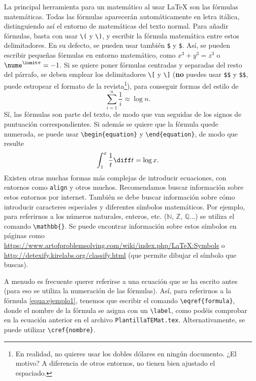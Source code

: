 \documentclass{TEMat-article}
\begin{document}
La principal herramienta para un matemático al usar \LaTeX{} son las fórmulas matemáticas.
Todas las fórmulas aparecerán automáticamente en letra itálica, distinguiendo así el entorno de matemáticas del texto normal.
Para añadir fórmulas, basta con usar \verb+\(+ y \verb+\)+, y escribir la fórmula matemática entre estos delimitadores.
En su defecto, se pueden usar también \verb+$+ y \verb+$+.
Así, se pueden escribir pequeñas fórmulas en entorno matemático, como \(x^3+y^3=z^3\) o $\nume^{\iunit\pi}=-1$.
Si se quiere poner fórmulas centradas y separadas del resto del párrafo, se deben emplear los delimitadores \verb+\[+ y \verb+\]+ (\textbf{no} puedes usar \verb+$$+ y \verb+$$+, puede estropear el formato de la revista\footnote{En realidad, no quieres usar los dobles dólares en ningún documento. ¿El motivo? A diferencia de otros entornos, no tienen bien ajustado el espaciado.}), para conseguir formas del estilo de
\[\sum_{i=1}^n\frac{1}{i}\approx\log n.\]
Sí, las fórmulas son parte del texto, de modo que van seguidas de los signos de puntuación correspondientes.
Si además se quiere que la fórmula quede numerada, se puede usar \verb+\begin{equation}+ y \verb+\end{equation}+, de modo que resulte
\begin{equation}\label{equa:ejemplo1}
\int_{1}^x\frac{1}{t} \diff t = \log x.
\end{equation}
Existen otras muchas formas más complejas de introducir ecuaciones, con entornos como \verb+align+ y otros muchos.
Recomendamos buscar información sobre estos entornos por internet.
También se debe buscar información sobre cómo introducir caracteres especiales y diferentes símbolos matemáticos.
Por ejemplo, para referirnos a los números naturales, enteros, etc. ($\mathbb{N}$, $\mathbb{Z}$, $\mathbb{Q}$...) se utiliza el comando \verb+\mathbb{}+.
Se puede encontrar información sobre estos símbolos en páginas como \url{https://www.artofproblemsolving.com/wiki/index.php/LaTeX:Symbols} o \url{http://detexify.kirelabs.org/classify.html} (que permite dibujar el símbolo que buscas).

A menudo es frecuente querer referirse a una ecuación que se ha escrito antes (para eso se utiliza la numeración de las fórmulas).
Así, para referirnos a la fórmula \eqref{equa:ejemplo1}, tenemos que escribir el comando \verb+\eqref{formula}+, donde el nombre de la fórmula se asigna con un \verb+\label+, como podéis comprobar en la ecuación anterior en el archivo \verb+PlantillaTEMat.tex+.
Alternativamente, se puede utilizar \verb+\cref{nombre}+.
\end{document}
